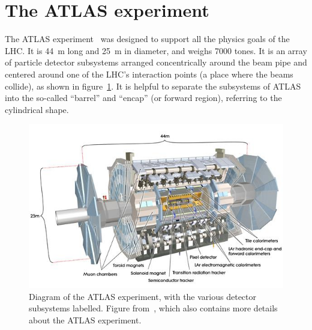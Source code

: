 

\section{The ATLAS experiment}
\label{sec:atlas}

The ATLAS experiment~\cite{collaboration_atlas_2008} was designed to support all the physics goals of the LHC. It is \SI{44}{\meter} long and \SI{25}{\meter} in diameter, and weighs 7000 tones. It is an array of particle detector subsystems arranged concentrically around the beam pipe and centered around one of the LHC's interaction points (a place where the beams collide), as shown in figure~\ref{fig:atlas}. It is helpful to separate the subsystems of ATLAS into the so-called ``barrel'' and ``encap'' (or forward region), referring to the cylindrical shape.  %

\begin{figure}
    \centering
    \includegraphics[width = \textwidth]{figures/atlas_diagram.png}
    \caption{Diagram of the ATLAS experiment, with the various detector subsystems labelled. Figure from~\cite{collaboration_atlas_2008}, which also contains more details about the ATLAS experiment.}
    \label{fig:atlas}
\end{figure}

